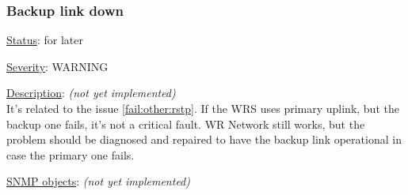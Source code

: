 \subsubsection{\bf Backup link down}
		\begin{packed_enum}
			\item [] \underline{Status}: for later
			\item [] \underline{Severity}: WARNING
			\item [] \underline{Description}: \emph{(not yet implemented)}\\
				It's related to the issue \ref{fail:other:rstp}. If the WRS uses primary
				uplink, but the backup one fails, it's not a critical fault. WR Network
				still works, but the problem should be diagnosed and repaired to have
				the backup link operational in case the primary one fails.
			\item [] \underline{SNMP objects}: \emph{(not yet implemented)}
		\end{packed_enum}

